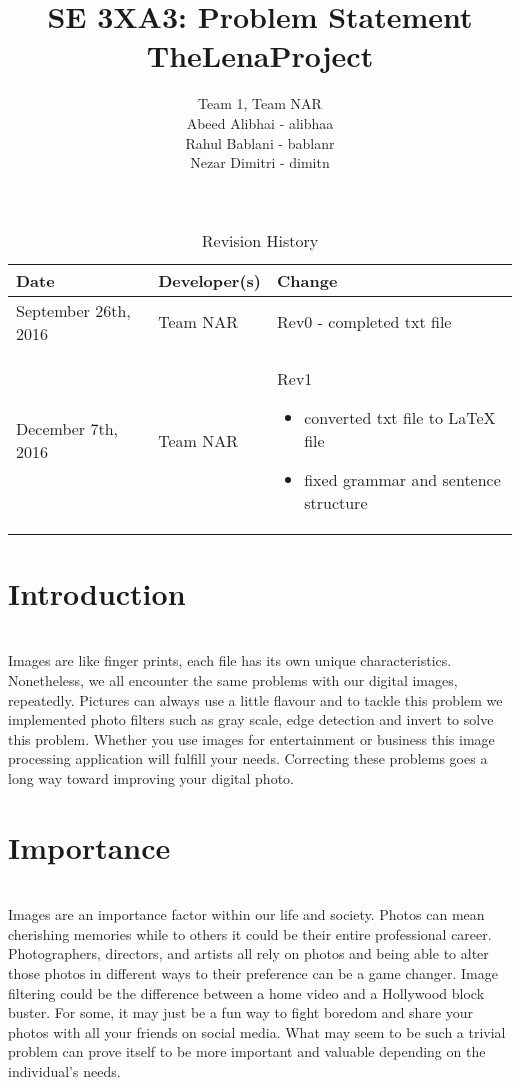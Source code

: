 \documentclass{article}
\title{SE 3XA3: Problem Statement\\TheLenaProject}
\author{Team 1, Team NAR
		\\Abeed Alibhai - alibhaa
		\\Rahul Bablani - bablanr
		\\Nezar Dimitri - dimitn
}
\date{}
\begin{document}
\begin{table}[hp]
\caption{Revision History} \label{TblRevisionHistory}
\begin{tabularx}{\textwidth}{llX}
\toprule
\textbf{Date} & \textbf{Developer(s)} & \textbf{Change}\\
\midrule
September 26th, 2016 & Team NAR & Rev0 - completed txt file\\ 
December 7th, 2016 & Team NAR & Rev1
\begin{itemize}
	\item converted txt file to LaTeX file
	\item fixed grammar and sentence structure
\end{itemize}
\\
\bottomrule
\end{tabularx}
\end{table}

\newpage

\maketitle

\section{Introduction}
\\
Images are like finger prints, each file has its own unique characteristics. Nonetheless, we all encounter the same problems with our digital images, repeatedly. Pictures can always use a little flavour and to tackle this problem we implemented photo filters such as gray scale, edge detection and invert to solve this problem. Whether you use images for entertainment or business this image processing application will fulfill your needs. Correcting these problems goes a long way toward improving your digital photo.

\section{Importance}

\\
Images are an importance factor within our life and society. Photos can mean cherishing memories while to others it could be their entire professional career. Photographers, directors, and artists all rely on photos and being able to alter those photos in different ways to their preference can be a game changer. Image filtering could be the difference between a home video and a Hollywood block buster. For some, it may just be a fun way to fight boredom and share your photos with all your friends on social media. What may seem to be such a trivial problem can prove itself to be more important and valuable depending on the individual's needs. 
\end{document}
